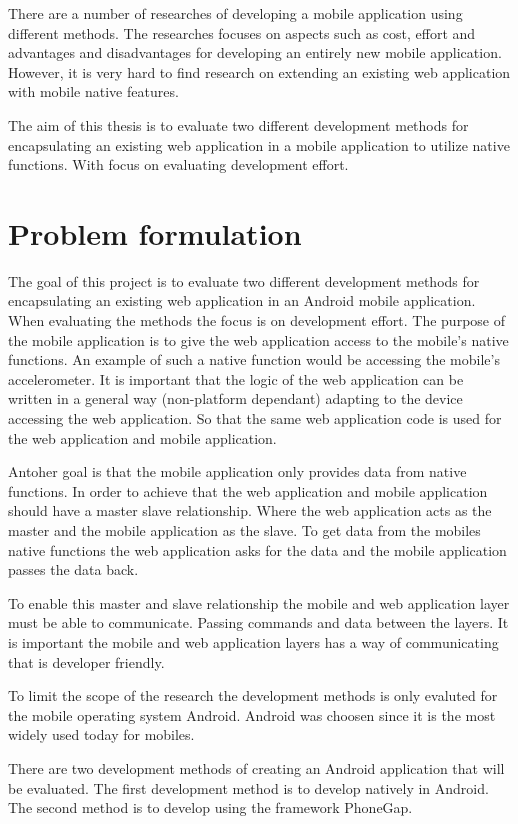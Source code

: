There are a number of researches of developing a mobile application using different methods. The researches focuses on aspects such as cost, effort and advantages and disadvantages for developing an entirely new mobile application. However, it is very hard to find research on extending an existing web application with mobile native features. 

The aim of this thesis is to evaluate two different development methods for encapsulating an existing web application in a mobile application to utilize native functions. With focus on evaluating development effort.

\section{Problem formulation}\label{section-problem-formulation}
The goal of this project is to evaluate two different development methods for encapsulating an existing web application in an Android mobile application. When evaluating the methods the focus is on development effort. The purpose of the mobile application is to give the web application access to the mobile's native functions. An example of such a native function would be accessing the mobile's accelerometer. It is important that the logic of the web application can be written in a general way (non-platform dependant) adapting to the device accessing the web application. So that the same web application code is used for the web application and mobile application.

Antoher goal is that the mobile application only provides data from native functions. In order to achieve that the web application and mobile application should have a master slave relationship. Where the web application acts as the master and the mobile application as the slave. To get data from the mobiles native functions the web application asks for the data and the mobile application passes the data back.

To enable this master and slave relationship the mobile and web application layer must be able to communicate. Passing commands and data between the layers. It is important the mobile and web application layers has a way of communicating that is developer friendly. 

To limit the scope of the research the development methods is only evaluted for the mobile operating system Android. Android was choosen since it is the most widely used today for mobiles.

There are two development methods of creating an Android application that will be evaluated. The first development method is to develop natively in Android. The second method is to develop using the framework PhoneGap.

